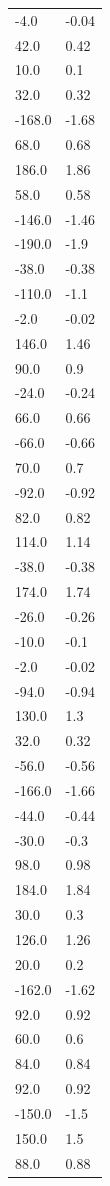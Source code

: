 \begin{longtable}{ll}
-4.0 & -0.04 \\
42.0 & 0.42 \\
10.0 & 0.1 \\
32.0 & 0.32 \\
-168.0 & -1.68 \\
68.0 & 0.68 \\
186.0 & 1.86 \\
58.0 & 0.58 \\
-146.0 & -1.46 \\
-190.0 & -1.9 \\
-38.0 & -0.38 \\
-110.0 & -1.1 \\
-2.0 & -0.02 \\
146.0 & 1.46 \\
90.0 & 0.9 \\
-24.0 & -0.24 \\
66.0 & 0.66 \\
-66.0 & -0.66 \\
70.0 & 0.7 \\
-92.0 & -0.92 \\
82.0 & 0.82 \\
114.0 & 1.14 \\
-38.0 & -0.38 \\
174.0 & 1.74 \\
-26.0 & -0.26 \\
-10.0 & -0.1 \\
-2.0 & -0.02 \\
-94.0 & -0.94 \\
130.0 & 1.3 \\
32.0 & 0.32 \\
-56.0 & -0.56 \\
-166.0 & -1.66 \\
-44.0 & -0.44 \\
-30.0 & -0.3 \\
98.0 & 0.98 \\
184.0 & 1.84 \\
30.0 & 0.3 \\
126.0 & 1.26 \\
20.0 & 0.2 \\
-162.0 & -1.62 \\
92.0 & 0.92 \\
60.0 & 0.6 \\
84.0 & 0.84 \\
92.0 & 0.92 \\
-150.0 & -1.5 \\
150.0 & 1.5 \\
88.0 & 0.88 \\

\end{longtable}
